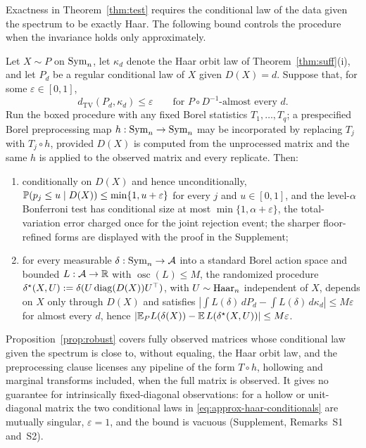 Exactness in Theorem~\ref{thm:test} requires the conditional law of the
data given the spectrum to be exactly Haar. The following bound controls
the procedure when the invariance holds only approximately.

\begin{proposition}
\label{prop:robust}
Let $X\sim P$ on $\mathrm{Sym}_n$, let $\kappa_d$ denote the Haar orbit law
of Theorem~\ref{thm:suff}(i), and let $P_d$ be a regular conditional
law of $X$ given $D(X)=d$. Suppose that, for some
$\varepsilon\in[0,1]$,
\begin{equation}
\label{eq:approx-haar-conditionals}
d_{\mathrm{TV}}(P_d,\kappa_d)\le\varepsilon
\qquad\text{for $P\circ D^{-1}$-almost every }d.
\end{equation}
Run the boxed procedure with any fixed Borel statistics
$T_1,\dots,T_q$; a prespecified Borel preprocessing map
$h:\mathrm{Sym}_n\to\mathrm{Sym}_n$ may be incorporated by replacing $T_j$ with
$T_j\circ h$, provided $D(X)$ is computed from the unprocessed matrix
and the same $h$ is applied to the observed matrix and every
replicate. Then:
\begin{enumerate}[label=(\roman*),itemsep=1pt,topsep=2pt]
\item conditionally on $D(X)$ and hence unconditionally,
$\mathbb{P}(p_j\le u\mid D(X))\le\min\{1,u+\varepsilon\}$ for every $j$
and $u\in[0,1]$, and the level-$\alpha$ Bonferroni test has
conditional size at most $\min\{1,\alpha+\varepsilon\}$, the
total-variation error charged once for the joint rejection event; the
sharper floor-refined forms are displayed with the proof in the
Supplement;
\item for every measurable $\delta:\mathrm{Sym}_n\to\mathcal A$ into a standard
Borel action space and bounded $L:\mathcal A\to\mathbb{R}$ with
$\operatorname{osc}(L)\le M$, the randomized procedure
$\delta^{\star}(X,U):=\delta(U\operatorname{diag}(D(X))U^\top)$, with
$U\sim\mathrm{Haar}_n$ independent of $X$, depends on $X$ only through
$D(X)$ and satisfies
$|\int L(\delta)\,dP_d-\int L(\delta)\,d\kappa_d|\le M\varepsilon$
for almost every $d$, hence
$|\mathbb{E}_P L(\delta(X))-\mathbb{E}\,L(\delta^{\star}(X,U))|\le M\varepsilon$.
\end{enumerate}
\end{proposition}

Proposition~\ref{prop:robust} covers fully observed matrices whose
conditional law given the spectrum is close to, without equaling, the
Haar orbit law, and the preprocessing clause licenses any pipeline of
the form $T\circ h$, hollowing and marginal transforms included, when
the full matrix is observed. It gives no guarantee for intrinsically
fixed-diagonal observations: for a hollow or unit-diagonal matrix the
two conditional laws in \eqref{eq:approx-haar-conditionals} are
mutually singular, $\varepsilon=1$, and the bound is vacuous
(Supplement, Remarks~S1 and~S2).

